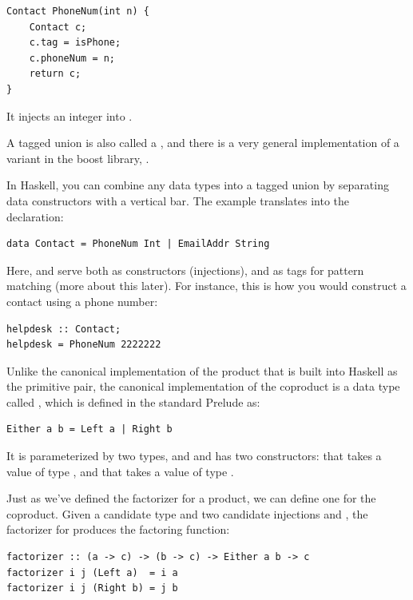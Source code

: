 \begin{Verbatim}
Contact PhoneNum(int n) { 
    Contact c;
    c.tag = isPhone;
    c.phoneNum = n;
    return c;
}
\end{Verbatim}
It injects an integer into .

A tagged union is also called a , and there is a very
general implementation of a variant in the boost library,
.

In Haskell, you can combine any data types into a tagged union by
separating data constructors with a vertical bar. The 
example translates into the declaration:

\begin{Verbatim}[commandchars=\\\{\}]
data Contact = PhoneNum Int | EmailAddr String
\end{Verbatim}
Here,  and  serve both as
constructors (injections), and as tags for pattern matching (more about
this later). For instance, this is how you would construct a contact
using a phone number:

\begin{Verbatim}[commandchars=\\\{\}]
helpdesk :: Contact;
helpdesk = PhoneNum 2222222
\end{Verbatim}
Unlike the canonical implementation of the product that is built into
Haskell as the primitive pair, the canonical implementation of the
coproduct is a data type called , which is defined in the
standard Prelude as:

\begin{Verbatim}[commandchars=\\\{\}]
Either a b = Left a | Right b
\end{Verbatim}
It is parameterized by two types,  and  and has two
constructors:  that takes a value of type , and
 that takes a value of type .

Just as we've defined the factorizer for a product, we can define one
for the coproduct. Given a candidate type  and two candidate
injections  and , the factorizer for 
produces the factoring function:

\begin{Verbatim}[commandchars=\\\{\}]
factorizer :: (a -> c) -> (b -> c) -> Either a b -> c
factorizer i j (Left a)  = i a
factorizer i j (Right b) = j b
\end{Verbatim}

